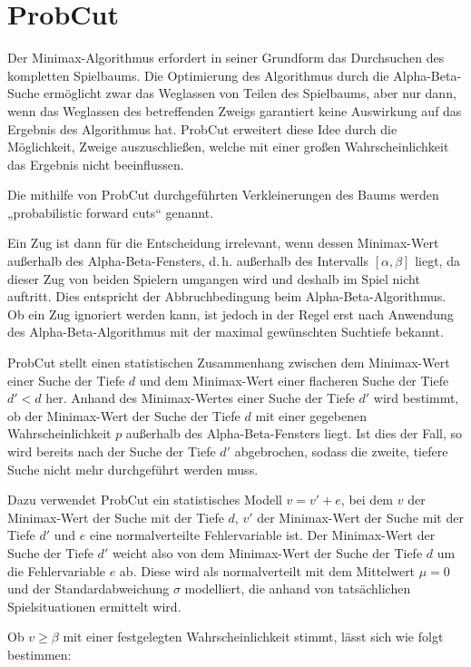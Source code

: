 \section{ProbCut}
\label{sec:probcut}

Der Minimax-Algorithmus erfordert in seiner Grundform das Durchsuchen des kompletten Spielbaums. Die Optimierung des
Algorithmus durch die Alpha-Beta-Suche ermöglicht zwar das Weglassen von Teilen des Spielbaums, aber nur dann, wenn das
Weglassen des betreffenden Zweigs garantiert keine Auswirkung auf das Ergebnis des Algorithmus hat. ProbCut erweitert
diese Idee durch die Möglichkeit, Zweige auszuschließen, welche mit einer großen Wahrscheinlichkeit das Ergebnis nicht
beeinflussen.

Die mithilfe von ProbCut durchgeführten Verkleinerungen des Baums werden „probabilistic forward cuts“ genannt.

Ein Zug ist dann für die Entscheidung irrelevant, wenn dessen Minimax-Wert außerhalb des Alpha-Beta-Fensters, d.\,h.
außerhalb des Intervalls \([\alpha,\beta]\) liegt, da dieser Zug von beiden Spielern umgangen wird und deshalb im Spiel
nicht auftritt. Dies entspricht der Abbruchbedingung beim Alpha-Beta-Algorithmus. Ob ein Zug ignoriert werden kann, ist
jedoch in der Regel erst nach Anwendung des Alpha-Beta-Algorithmus mit der maximal gewünschten Suchtiefe bekannt.

ProbCut stellt einen statistischen Zusammenhang zwischen dem Minimax-Wert einer Suche der Tiefe \(d\) und dem
Minimax-Wert einer flacheren Suche der Tiefe \(d'<d\) her. Anhand des Minimax-Wertes einer Suche der Tiefe \(d'\) wird
bestimmt, ob der Minimax-Wert der Suche der Tiefe \(d\) mit einer gegebenen Wahrscheinlichkeit \(p\) außerhalb des
Alpha-Beta-Fensters liegt. Ist dies der Fall, so wird bereits nach der Suche der Tiefe \(d'\) abgebrochen, sodass die
zweite, tiefere Suche nicht mehr durchgeführt werden muss.

Dazu verwendet ProbCut ein statistisches Modell \(v=v'+e\), bei dem \(v\) der Minimax-Wert der Suche mit der Tiefe
\(d\), \(v'\) der Minimax-Wert der Suche mit der Tiefe \(d'\) und \(e\) eine normalverteilte Fehlervariable ist. Der
Minimax-Wert der Suche der Tiefe \(d'\) weicht also von dem Minimax-Wert der Suche der Tiefe \(d\) um die Fehlervariable
\(e\) ab. Diese wird als normalverteilt mit dem Mittelwert $\mu=0$ und der Standardabweichung \(\sigma\) modelliert, die
anhand von tatsächlichen Spielsituationen ermittelt wird.

Ob $v\geq\beta$ mit einer festgelegten Wahrscheinlichkeit stimmt, lässt sich wie folgt bestimmen:

